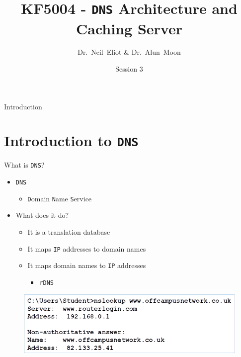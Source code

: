 \documentclass{beamer}
\title{KF5004 - \texttt{DNS} Architecture and Caching Server}
\author{Dr.~Neil~Eliot \& Dr.~Alun~Moon}
\institute[Northumbria University] %
{
  Department of Computer and Information Sciences\\
  University of Northumbria
}
\date{Session 3}
\begin{document}
\begin{frame}
  \titlepage
\end{frame}

\begin{frame}{Introduction}
  \tableofcontents
\end{frame}


\section{Introduction to \texttt{DNS}}
\begin{frame}{What is \texttt{DNS}?}
  \begin{itemize}
    \item \texttt{DNS}
      \begin{itemize}
          \item \texttt{D}omain \texttt{N}ame \texttt{S}ervice
      \end{itemize}
    \item What does it do?   
      \begin{itemize}
        \item It is a translation database
        \item It maps \texttt{IP} addresses to domain names
        \item It maps domain names to \texttt{IP} addresses
          \begin{itemize}
            \item \texttt{rDNS}
          \end{itemize}
      \end{itemize} 
  \end{itemize}
  \begin{figure}
    \begin{center}
      \includegraphics[width=0.8\linewidth]{nslookup.png}
    \end{center}
  \end{figure}
\end{frame}
\end{document}
